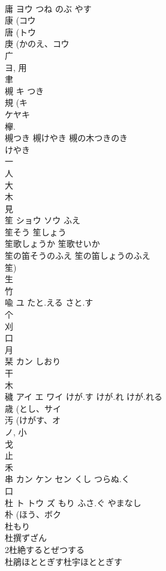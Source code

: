 \documentclass[8pt]{extreport}
\begin{document}
\begin{CJK}{UTF8}{min}
\\	庸	ヨウ	つね のぶ やす	
\\	康 (コウ 
\\	唐 (トウ 
\\	庚 (かのえ、コウ 
\\	广 
\\	ヨ, 用 
\\	聿 
\\	槻	キ	つき	
\\	規 (キ 
\\	ケヤキ 
\\	欅. 
\\	槻つき 槻けやき 槻の木つきのき 
\\	けやき
\\	一 
\\	人 
\\	大 
\\	木 
\\	見 
\\	笙	ショウ ソウ	ふえ	
\\	笙そう 笙しょう 
\\	笙歌しょうか 笙歌せいか 
\\	笙の笛そうのふえ 笙の笛しょうのふえ 
\\	笙) 
\\	生 
\\	竹 
\\	喩	ユ	たと.える さと.す	
\\	个 
\\	刈 
\\	口 
\\	月 
\\	栞	カン	しおり	
\\	干 
\\	木 
\\	穢	アイ エ ワイ	けが.す けが.れ けが.れる	
\\	歳 (とし、サイ 
\\	汚 (けがす、オ 
\\	ノ, 小 
\\	戈 
\\	止 
\\	禾 
\\	串	カン ケン セン	くし つらぬ.く	
\\	口 
\\	杜	ト トウ ズ	もり ふさ.ぐ やまなし	
\\	朴 (ほう、ボク 
\\	杜もり
\\	杜撰ずざん
\\	2杜絶するとぜつする
\\	杜鵑ほととぎす杜宇ほととぎす

\end{CJK}
\end{document}
